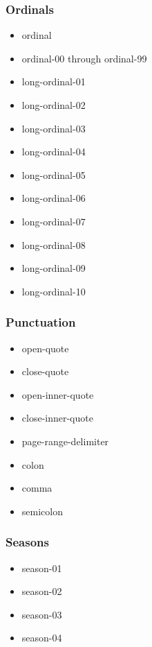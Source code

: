 \hypertarget{ordinals}{%
\subsubsection{Ordinals}\label{ordinals}}

\begin{itemize}
\tightlist
\item
  ordinal
\item
  ordinal-00 through ordinal-99
\item
  long-ordinal-01
\item
  long-ordinal-02
\item
  long-ordinal-03
\item
  long-ordinal-04
\item
  long-ordinal-05
\item
  long-ordinal-06
\item
  long-ordinal-07
\item
  long-ordinal-08
\item
  long-ordinal-09
\item
  long-ordinal-10
\end{itemize}

\hypertarget{punctuation}{%
\subsubsection{Punctuation}\label{punctuation}}

\begin{itemize}
\tightlist
\item
  open-quote
\item
  close-quote
\item
  open-inner-quote
\item
  close-inner-quote
\item
  page-range-delimiter
\item
  colon
\item
  comma
\item
  semicolon
\end{itemize}

\hypertarget{seasons-1}{%
\subsubsection{Seasons}\label{seasons-1}}

\begin{itemize}
\tightlist
\item
  season-01
\item
  season-02
\item
  season-03
\item
  season-04
\end{itemize}

